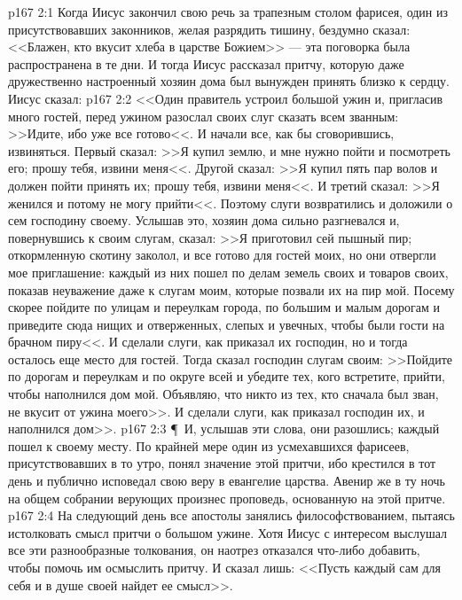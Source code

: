 \vs p167 2:1 Когда Иисус закончил свою речь за трапезным столом фарисея, один из присутствовавших законников, желая разрядить тишину, бездумно сказал: <<Блажен, кто вкусит хлеба в царстве Божием>> --- эта поговорка была распространена в те дни. И тогда Иисус рассказал притчу, которую даже дружественно настроенный хозяин дома был вынужден принять близко к сердцу. Иисус сказал:
\vs p167 2:2 <<Один правитель устроил большой ужин и, пригласив много гостей, перед ужином разослал своих слуг сказать всем званным: >>Идите, ибо уже все готово<<. И начали все, как бы сговорившись, извиняться. Первый сказал: >>Я купил землю, и мне нужно пойти и посмотреть его; прошу тебя, извини меня<<. Другой сказал: >>Я купил пять пар волов и должен пойти принять их; прошу тебя, извини меня<<. И третий сказал: >>Я женился и потому не могу прийти<<. Поэтому слуги возвратились и доложили о сем господину своему. Услышав это, хозяин дома сильно разгневался и, повернувшись к своим слугам, сказал: >>Я приготовил сей пышный пир; откормленную скотину заколол, и все готово для гостей моих, но они отвергли мое приглашение: каждый из них пошел по делам земель своих и товаров своих, показав неуважение даже к слугам моим, которые позвали их на пир мой. Посему скорее пойдите по улицам и переулкам города, по большим и малым дорогам и приведите сюда нищих и отверженных, слепых и увечных, чтобы были гости на брачном пиру<<. И сделали слуги, как приказал их господин, но и тогда осталось еще место для гостей. Тогда сказал господин слугам своим: >>Пойдите по дорогам и переулкам и по округе всей и убедите тех, кого встретите, прийти, чтобы наполнился дом мой. Объявляю, что никто из тех, кто сначала был зван, не вкусит от ужина моего>>. И сделали слуги, как приказал господин их, и наполнился дом>>.
\vs p167 2:3 \P\ И, услышав эти слова, они разошлись; каждый пошел к своему месту. По крайней мере один из усмехавшихся фарисеев, присутствовавших в то утро, понял значение этой притчи, ибо крестился в тот день и публично исповедал свою веру в евангелие царства. Авенир же в ту ночь на общем собрании верующих произнес проповедь, основанную на этой притче.
\vs p167 2:4 На следующий день все апостолы занялись философствованием, пытаясь истолковать смысл притчи о большом ужине. Хотя Иисус с интересом выслушал все эти разнообразные толкования, он наотрез отказался что\hyp{}либо добавить, чтобы помочь им осмыслить притчу. И сказал лишь: <<Пусть каждый сам для себя и в душе своей найдет ее смысл>>.
